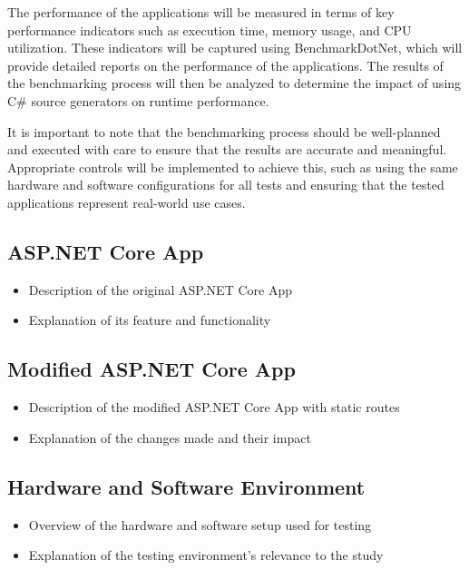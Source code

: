 The performance of the applications will be measured in terms of key performance indicators such as execution time, memory usage, and CPU utilization. These indicators will be captured using BenchmarkDotNet, which will provide detailed reports on the performance of the applications. The results of the benchmarking process will then be analyzed to determine the impact of using C\# source generators on runtime performance.

It is important to note that the benchmarking process should be well-planned and executed with care to ensure that the results are accurate and meaningful. Appropriate controls will be implemented to achieve this, such as using the same hardware and software configurations for all tests and ensuring that the tested applications represent real-world use cases.

\subsection{ASP.NET Core App}

\begin{itemize}
    \item Description of the original ASP.NET Core App
    \item Explanation of its feature and functionality
\end{itemize}

\subsection{Modified ASP.NET Core App}

\begin{itemize}
    \item Description of the modified ASP.NET Core App with static routes
    \item Explanation of the changes made and their impact
\end{itemize}

\subsection{Hardware and Software Environment}

\begin{itemize}
    \item Overview of the hardware and software setup used for testing
    \item Explanation of the testing environment's relevance to the study
\end{itemize}

